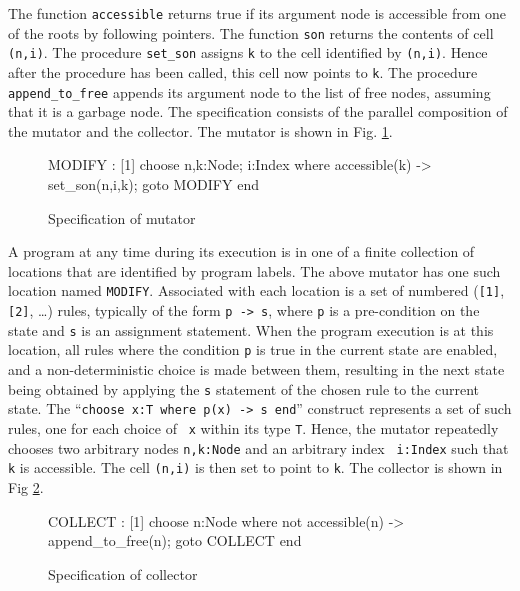 The  function {\tt accessible} returns  true if  its argument node is
accessible from one of the roots by  following pointers.  The function
{\tt son} returns  the contents of  cell  {\tt (n,i)}\@.  The  procedure
{\tt set\_son} assigns {\tt k} to the cell identified  by {\tt (n,i)}\@. 
Hence after the  procedure has been called,   this cell now points  to
{\tt k}\@.  The procedure {\tt   append\_to\_free} appends its  argument
node to the list  of free nodes,  assuming that it is  a garbage node. 
The specification consists of  the parallel composition of the mutator
and   the     collector.    The  mutator is shown in Fig. \ref{spec-mutator}.

\begin{figure}[htb]
\begin{smallsession}
  MODIFY : 
    [1] choose n,k:Node; i:Index where accessible(k) -> 
          set_son(n,i,k); 
          goto MODIFY
        end
\end{smallsession}
\caption{Specification of mutator}
\label{spec-mutator}
\end{figure}

A program at  any time during   its execution is  in  one of a  finite
collection of locations  that are identified  by program  labels.  The
above mutator has one such location named  {\tt MODIFY}\@.  Associated
with  each location is  a set of  numbered ({\tt [1]}, {\tt [2]}, \ldots)
rules,    typically of the form   {\tt  p -> s},   where  {\tt p} is a
pre-condition on the  state and  {\tt s}  is an assignment  statement. 
When the program  execution is at this  location, all rules where  the
condition  {\tt p}  is true  in the  current state are  enabled, and a
non-deterministic choice is  made between them,  resulting in the next
state being obtained  by applying the {\tt s}  statement of the chosen
rule to the current state.  The ``{\tt choose x:T where  p(x) -> s end}''
construct represents a set of such rules,  one for each choice of {\tt
  x} within its type {\tt T}\@.  Hence, the mutator repeatedly chooses
two   arbitrary  nodes {\tt  n,k:Node}   and  an arbitrary index  {\tt
  i:Index} such that {\tt  k} is accessible.  The  cell {\tt (n,i)} is
then set to point to {\tt k}\@.  The collector is shown in Fig \ref{spec-collector}.

\begin{figure}[htb]
\begin{smallsession}
  COLLECT :
    [1] choose n:Node where not accessible(n) -> 
          append_to_free(n); 
          goto COLLECT
        end
\end{smallsession}
\caption{Specification of collector}
\label{spec-collector}
\end{figure}

